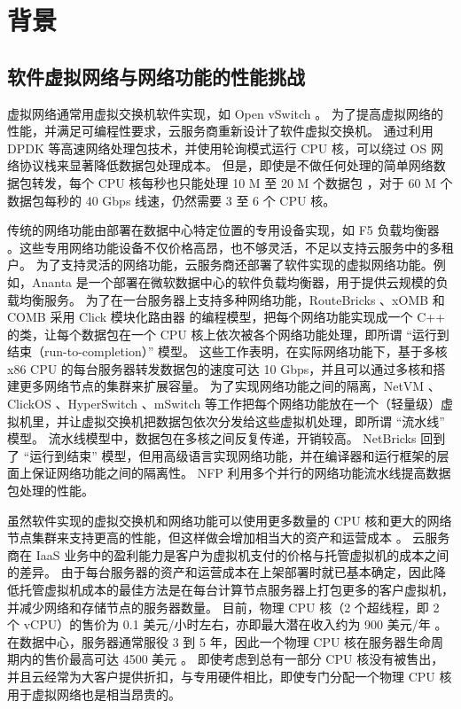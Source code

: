 \section{背景}
\label{clicknp:sec:background}

\subsection{软件虚拟网络与网络功能的性能挑战}


虚拟网络通常用虚拟交换机软件实现，如 Open vSwitch \cite{pfaff2015design}。
为了提高虚拟网络的性能，并满足可编程性要求，云服务商重新设计了软件虚拟交换机。
通过利用 DPDK \cite{dpdk} 等高速网络处理包技术，并使用轮询模式运行 CPU 核，可以绕过 OS 网络协议栈来显著降低数据包处理成本。
但是，即使是不做任何处理的简单网络数据包转发，每个 CPU 核每秒也只能处理 10 M 至 20 M 个数据包 \cite{martins2014clickos,netbricks}，对于 60 M 个数据包每秒的 40 Gbps 线速，仍然需要 3 至 6 个 CPU 核。

传统的网络功能由部署在数据中心特定位置的专用设备实现，如 F5 负载均衡器 \cite{f5-load-balancer}。这些专用网络功能设备不仅价格高昂，也不够灵活，不足以支持云服务中的多租户。
为了支持灵活的网络功能，云服务商还部署了软件实现的虚拟网络功能。例如，Ananta \cite {ananta} 是一个部署在微软数据中心的软件负载均衡器，用于提供云规模的负载均衡服务。
为了在一台服务器上支持多种网络功能，RouteBricks \cite {routebricks}、xOMB \cite{anderson2012xomb} 和 COMB \cite{comb} 采用 Click 模块化路由器 \cite{kohler2000click} 的编程模型，把每个网络功能实现成一个 C++ 的类，让每个数据包在一个 CPU 核上依次被各个网络功能处理，即所谓 ``运行到结束（run-to-completion）'' 模型。
这些工作表明，在实际网络功能下，基于多核 x86 CPU 的每台服务器转发数据包的速度可达 10 Gbps，并且可以通过多核和搭建更多网络节点的集群来扩展容量。
为了实现网络功能之间的隔离，NetVM \cite{hwang2015netvm}、ClickOS \cite{martins2014clickos}、HyperSwitch \cite{ram2013hyper}、mSwitch \cite{eisenbud2016maglev} 等工作把每个网络功能放在一个（轻量级）虚拟机里，并让虚拟交换机把数据包依次分发给这些虚拟机处理，即所谓 ``流水线'' 模型。
流水线模型中，数据包在多核之间反复传递，开销较高。
NetBricks \cite{netbricks} 回到了 ``运行到结束'' 模型，但用高级语言实现网络功能，并在编译器和运行框架的层面上保证网络功能之间的隔离性。
NFP \cite{sun2017nfp} 利用多个并行的网络功能流水线提高数据包处理的性能。

虽然软件实现的虚拟交换机和网络功能可以使用更多数量的 CPU 核和更大的网络节点集群来支持更高的性能，但这样做会增加相当大的资产和运营成本 \cite {ananta,duet}。
云服务商在 IaaS 业务中的盈利能力是客户为虚拟机支付的价格与托管虚拟机的成本之间的差异。
由于每台服务器的资产和运营成本在上架部署时就已基本确定，因此降低托管虚拟机成本的最佳方法是在每台计算节点服务器上打包更多的客户虚拟机，并减少网络和存储节点的服务器数量。
目前，物理 CPU 核（2 个超线程，即 2 个 vCPU）的售价为 0.1 美元/小时左右，亦即最大潜在收入约为 900 美元/年 \cite{smartnic}。
在数据中心，服务器通常服役 3 到 5 年，因此一个物理 CPU 核在服务器生命周期内的售价最高可达 4500 美元 \cite{smartnic}。
即使考虑到总有一部分 CPU 核没有被售出，并且云经常为大客户提供折扣，与专用硬件相比，即使专门分配一个物理 CPU 核用于虚拟网络也是相当昂贵的。


